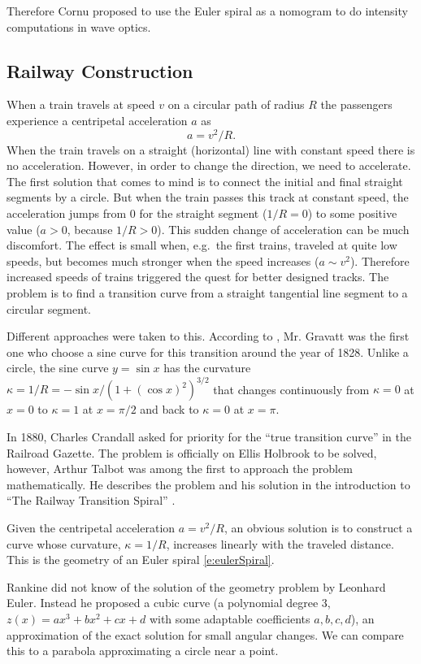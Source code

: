 \documentclass[12pt]{article}
\begin{document}
Therefore Cornu proposed to use the Euler spiral as a nomogram to do intensity computations in wave optics.

\FloatBarrier 
\subsection{Railway  Construction}
When a train travels at speed $v$ on a circular path of radius $R$ the passengers experience a centripetal acceleration $a$ as
$$  a = v^2/R.
$$ When the train travels on a straight (horizontal) line with constant speed there is no acceleration.  However, in order to change the direction, we need to accelerate.  The first solution that comes to mind is to connect the initial and final straight segments by a circle.  But when the train passes this track at constant speed, the acceleration jumps from 0 for the straight segment ($1/R=0$) to some positive value ($a>0$, because $1/R>0$).  This sudden change of acceleration can be much discomfort.  The effect is small when, e.g.~the first trains, traveled at quite low speeds, but becomes much stronger when the speed increases ($a\sim v^2$).  Therefore increased speeds of trains triggered the quest for better designed tracks.  The problem is to find a transition curve from a straight tangential line segment to a circular segment.

Different approaches were taken to this. According to \cite{Lev08}, Mr. Gravatt was the first one who choose a sine curve for this transition around the year of 1828. Unlike a circle, the sine curve $y=\sin x$ has the curvature $\kappa=1/R=-\sin x/\left(1+(\cos x)^2\right)^{3/2}$ that changes continuously from $\kappa=0$ at $x=0$ to $\kappa=1$ at $x=\pi/2$ and back to $\kappa=0$ at $x=\pi$.

In 1880, Charles Crandall asked for priority for the ``true transition curve'' in the Railroad Gazette.  The problem is officially on Ellis Holbrook to be solved, however, Arthur Talbot was among the first to approach the problem mathematically.  He describes the problem and his solution in the introduction to ``The Railway Transition Spiral'' \cite{Tal99}.

Given the centripetal acceleration $a=v^2/R$, an obvious solution is to construct a curve whose curvature, $\kappa=1/R$, increases linearly with the traveled distance. This is the geometry of an Euler spiral \eqref{e:eulerSpiral}.

Rankine did not know of the solution of the geometry problem by Leonhard Euler.  Instead he proposed a cubic curve (a polynomial degree 3, $z(x)=ax^3+bx^2+cx+d$ with some adaptable coefficients $a,b,c,d$), an approximation of the exact solution for small angular changes.   We can compare this to a parabola approximating a circle near a point.
\end{document}

